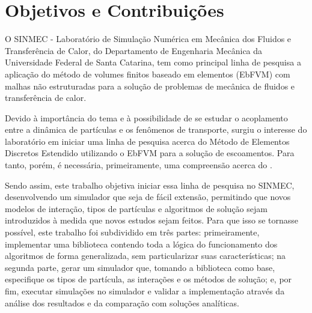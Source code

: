 \section{Objetivos e Contribuições} \label{sec:objectives_and_contributions}

O SINMEC - Laboratório de Simulação Numérica em Mecânica dos Fluidos e Transferência de Calor, do Departamento de Engenharia Mecânica da Universidade Federal de Santa Catarina, tem como principal linha de pesquisa a aplicação do método de volumes finitos baseado em elementos (EbFVM) com malhas não estruturadas para a solução de problemas de mecânica de fluidos e transferência de calor.

Devido à importância do tema e à possibilidade de se estudar o acoplamento entre a dinâmica de partículas e os fenômenos de transporte, surgiu o interesse do laboratório em iniciar uma linha de pesquisa acerca do Método de Elementos Discretos Estendido utilizando o EbFVM para a solução de escoamentos. Para tanto, porém, é necessária, primeiramente, uma compreensão acerca do \DEM{}.

Sendo assim, este trabalho objetiva iniciar essa linha de pesquisa no SINMEC, desenvolvendo um simulador que seja de fácil extensão, permitindo que novos modelos de interação, tipos de partículas e algoritmos de solução sejam introduzidos à medida que novos estudos sejam feitos. Para que isso se tornasse possível, este trabalho foi subdividido em três partes: primeiramente, implementar uma biblioteca contendo toda a lógica do funcionamento dos algoritmos \DEM{} de forma generalizada, sem particularizar suas características; na segunda parte, gerar um simulador que, tomando a biblioteca como base, especifique os tipos de partícula, as interações e os métodos de solução; e, por fim, executar simulações no simulador e validar a implementação através da análise dos resultados e da comparação com soluções analíticas. 
 
